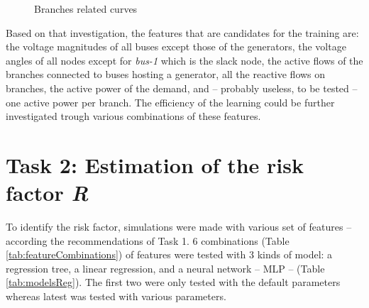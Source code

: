 \documentclass[11pt]{article}
\begin{document}
    \begin{figure}[H]
        \begin{subfigure}[t]{.4\textwidth}
            \centering
            
        \end{subfigure}\hspace{0.1\textwidth}
        \begin{subfigure}[t]{.4\textwidth}
            \centering
            
        \end{subfigure}
        \caption{\label{fig:Branch} Branches related curves}
    \end{figure}

    Based on that investigation, the features that are candidates for the training are: the voltage magnitudes of all buses except those of the generators, the voltage angles of all nodes except for \emph{bus-1} which is the slack node, the active flows of the branches connected to buses hosting a generator, all the reactive flows on branches, the active power of the demand, and -- probably useless, to be tested -- one active power per branch. The efficiency of the learning could be further investigated trough various combinations of these features.

    \pagebreak

\section{Task 2: Estimation of the risk factor \emph{R}}
    To identify the risk factor, simulations were made with various set of features -- according the recommendations of Task 1. 6 combinations (Table \ref{tab:featureCombinations}) of features were tested with 3 kinds of model: a regression tree, a linear regression, and a neural network -- MLP -- (Table \ref{tab:modelsReg}). The first two were only tested with the default parameters whereas latest was tested with various parameters.
    
\end{document}
